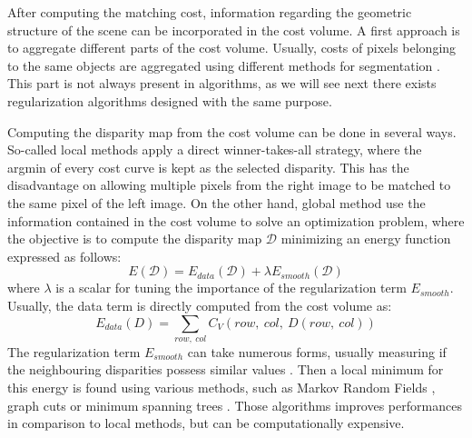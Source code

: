 After computing the matching cost, information regarding the geometric structure of the scene can be incorporated in the cost volume. A first approach is to aggregate different parts of the cost volume. Usually, costs of pixels belonging to the same objects are aggregated using different methods for segmentation \cite{ke_zhang_cross-based_2009, ji_superpixel_2021}. This part is not always present in algorithms, as we will see next there exists regularization algorithms designed with the same purpose. 

Computing the disparity map from the cost volume can be done in several ways. So-called local methods apply a direct winner-takes-all strategy, where the argmin of every cost curve is kept as the selected disparity. This has the disadvantage on allowing multiple pixels from the right image to be matched to the same pixel of the left image. On the other hand, global method use the information contained in the cost volume to solve an optimization problem, where the objective is to compute the disparity map $\mathcal{D}$ minimizing an energy function expressed as follows:
\begin{equation}
    E(\mathcal{D}) = E_{data}(\mathcal{D}) + \lambda E_{smooth}(\mathcal{D})
\end{equation}
where $\lambda$ is a scalar for tuning the importance of the regularization term $E_{smooth}$. Usually, the data term is directly computed from the cost volume as:
\begin{equation}\label{eq:global_methods}
    E_{data}(D) = \sum_{row,~col}C_V(row, ~col,~D(row, ~col))
\end{equation}
The regularization term $E_{smooth}$ can take numerous forms, usually measuring if the neighbouring disparities possess similar values \cite{scharstein_taxonomy_2001}. Then a local minimum for this energy is found using various methods, such as Markov Random Fields \cite{boykov_markov_1998, sun_stereo_2003}, graph cuts \cite{kolmogorov_computing_2001} or minimum spanning trees \cite{zureiki_stereo_2008, qingxiong_yang_non-local_2012}. Those algorithms improves performances in comparison to local methods, but can be computationally expensive.

